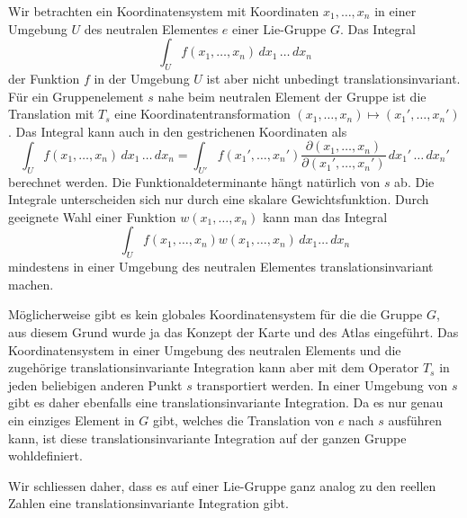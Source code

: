 Wir betrachten ein Koordinatensystem mit Koordinaten $x_1,\dots,x_n$
in einer Umgebung $U$ des neutralen Elementes $e$ einer Lie-Gruppe $G$.
Das Integral
\[
\int_{U} f(x_1,\dots,x_n) \,dx_1\,\dots\,dx_n
\]
der Funktion $f$ in der Umgebung $U$ ist aber nicht unbedingt
translationsinvariant.
Für ein Gruppenelement $s$ nahe beim neutralen Element der Gruppe
ist die Translation mit $T_s$ eine Koordinatentransformation
$(x_1,\dots,x_n)\mapsto (x_1',\dots,x_n')$.
Das Integral kann auch in den gestrichenen Koordinaten als
\[
\int_{U} f(x_1,\dots,x_n) \,dx_1\,\dots\,dx_n
=
\int_{U'} f(x_1',\dots,x_n')
\frac{\partial (x_1,\dots,x_n)}{\partial(x_1',\dots,x_n')}
\,dx_1'\,\dots\,dx_n'
\]
berechnet werden.
Die Funktionaldeterminante hängt natürlich von $s$ ab.
Die Integrale unterscheiden sich nur durch eine skalare Gewichtsfunktion.
Durch geeignete Wahl einer Funktion $w(x_1,\dots,x_n)$ kann man 
das Integral
\[
\int_{U} f(x_1,\dots,x_n) w(x_1,\dots,x_n)\,dx_1\dots\,dx_n
\]
mindestens in einer Umgebung des neutralen Elementes
translationsinvariant machen.

Möglicherweise gibt es kein globales Koordinatensystem für die 
die Gruppe $G$, aus diesem Grund wurde ja das Konzept der Karte
und des Atlas eingeführt.
Das Koordinatensystem in einer Umgebung des neutralen Elements und
die zugehörige translationsinvariante Integration kann aber mit
dem Operator $T_s$ in jeden beliebigen anderen Punkt $s$ transportiert
werden.
In einer Umgebung von $s$ gibt es daher ebenfalls eine
translationsinvariante Integration.
Da es nur genau ein einziges Element in $G$ gibt, welches die Translation
von $e$ nach $s$ ausführen kann, ist diese translationsinvariante 
Integration auf der ganzen Gruppe wohldefiniert.

Wir schliessen daher, dass es auf einer Lie-Gruppe ganz analog 
zu den reellen Zahlen eine translationsinvariante Integration
gibt.

